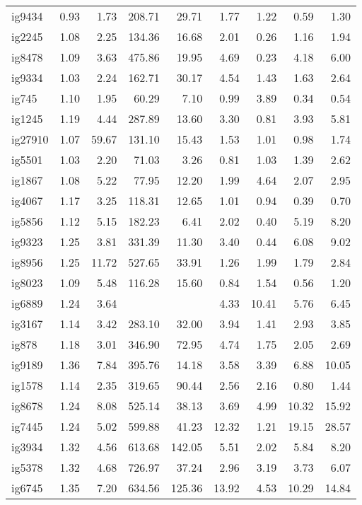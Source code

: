 \begin{longtable}{l|rr|rr|rr|rr}
ig9434 & 0.93 & 1.73 & 208.71 & 29.71 & 1.77 & 1.22 & 0.59 & 1.30 \\
ig2245 & 1.08 & 2.25 & 134.36 & 16.68 & 2.01 & 0.26 & 1.16 & 1.94 \\
ig8478 & 1.09 & 3.63 & 475.86 & 19.95 & 4.69 & 0.23 & 4.18 & 6.00 \\
ig9334 & 1.03 & 2.24 & 162.71 & 30.17 & 4.54 & 1.43 & 1.63 & 2.64 \\
ig745 & 1.10 & 1.95 & 60.29 & 7.10 & 0.99 & 3.89 & 0.34 & 0.54 \\
ig1245 & 1.19 & 4.44 & 287.89 & 13.60 & 3.30 & 0.81 & 3.93 & 5.81 \\
ig27910 & 1.07 & 59.67 & 131.10 & 15.43 & 1.53 & 1.01 & 0.98 & 1.74 \\
ig5501 & 1.03 & 2.20 & 71.03 & 3.26 & 0.81 & 1.03 & 1.39 & 2.62 \\
ig1867 & 1.08 & 5.22 & 77.95 & 12.20 & 1.99 & 4.64 & 2.07 & 2.95 \\
ig4067 & 1.17 & 3.25 & 118.31 & 12.65 & 1.01 & 0.94 & 0.39 & 0.70 \\
ig5856 & 1.12 & 5.15 & 182.23 & 6.41 & 2.02 & 0.40 & 5.19 & 8.20 \\
ig9323 & 1.25 & 3.81 & 331.39 & 11.30 & 3.40 & 0.44 & 6.08 & 9.02 \\
ig8956 & 1.25 & 11.72 & 527.65 & 33.91 & 1.26 & 1.99 & 1.79 & 2.84 \\
ig8023 & 1.09 & 5.48 & 116.28 & 15.60 & 0.84 & 1.54 & 0.56 & 1.20 \\
ig6889 & 1.24 & 3.64 &  &  & 4.33 & 10.41 & 5.76 & 6.45 \\
ig3167 & 1.14 & 3.42 & 283.10 & 32.00 & 3.94 & 1.41 & 2.93 & 3.85 \\
ig878 & 1.18 & 3.01 & 346.90 & 72.95 & 4.74 & 1.75 & 2.05 & 2.69 \\
ig9189 & 1.36 & 7.84 & 395.76 & 14.18 & 3.58 & 3.39 & 6.88 & 10.05 \\
ig1578 & 1.14 & 2.35 & 319.65 & 90.44 & 2.56 & 2.16 & 0.80 & 1.44 \\
ig8678 & 1.24 & 8.08 & 525.14 & 38.13 & 3.69 & 4.99 & 10.32 & 15.92 \\
ig7445 & 1.24 & 5.02 & 599.88 & 41.23 & 12.32 & 1.21 & 19.15 & 28.57 \\
ig3934 & 1.32 & 4.56 & 613.68 & 142.05 & 5.51 & 2.02 & 5.84 & 8.20 \\
ig5378 & 1.32 & 4.68 & 726.97 & 37.24 & 2.96 & 3.19 & 3.73 & 6.07 \\
ig6745 & 1.35 & 7.20 & 634.56 & 125.36 & 13.92 & 4.53 & 10.29 & 14.84 \\

\end{longtable}
